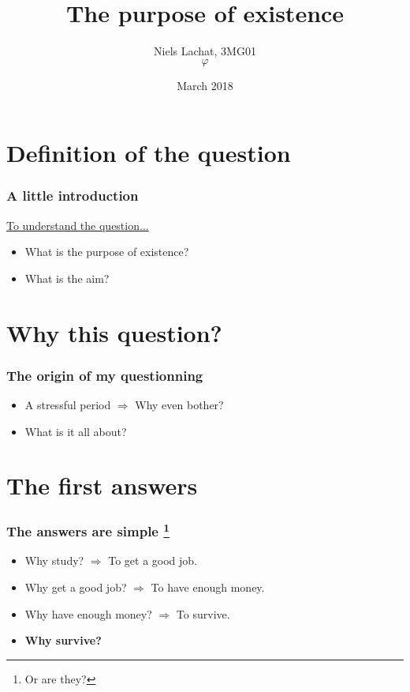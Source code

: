 \documentclass{beamer}
\title{The purpose of existence}
\author{Niels Lachat, 3MG01 \\ $\varphi$}
\date{March 2018}
\begin{document}
	\maketitle
	
	\tableofcontents
	
	\section{Definition of the question}
	
	\begin{frame}
		\frametitle{A little introduction}
		\href{../orig.gif}{To understand the question...} 
		
		\begin{itemize}
			\item What is the purpose of existence? 
			\item What is the aim?
		\end{itemize}
    \end{frame}
    
    
    \section{Why this question?}
    
    \begin{frame}
    		\frametitle{The origin of my questionning}
    		
    		\begin{itemize}
    			\item A stressful period
    			$\Rightarrow$ Why even bother? 
    			\item What is it all about?
    		\end{itemize}
    \end{frame}
    
    
    \section{The first answers}
    
    \begin{frame}
    		\frametitle{The answers are simple \footnote{Or are they?}}
    		
		\begin{itemize}
			\item Why study? $\Rightarrow$ To get a good job.
			\item Why get a good job? $\Rightarrow$ To have enough money.
			\item Why have enough money? $\Rightarrow$ To survive.
			\item \textbf{Why survive?}
		\end{itemize}		    		
    \end{frame}
    
\end{document}
